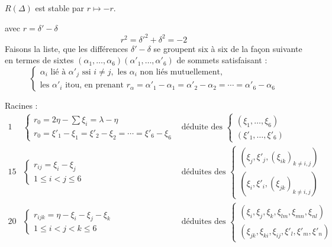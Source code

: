 \documentclass[11pt,a4paper]{article}
\begin{document}
$R(\Delta)$ est stable par $r \mapsto -r$.


avec $r = \delta' - \delta$
\[
r^2 = \delta'^2 + \delta^2 = -2
\]
Faisons la liste, 
\ill{} \ill{} que les différences  $\delta' -
\delta$ se groupent six à six de la façon suivante en termes de sixtes
 $(\alpha_1, \dots, \alpha_6)(\alpha'_1, \dots,
\alpha'_6)$  de sommets
satisfaisant :
\[
\begin{cases}
\alpha_i \text{ lié à } \alpha'_j \text{ ssi } i \neq j, \text{ les } \alpha_i \text{ non liés mutuellement}, \\
\text{les } \alpha'_i \text{ itou, en prenant } r_\alpha = \alpha'_1 - \alpha_1 = \alpha'_2 - \alpha_2 = \cdots = \alpha'_6 - \alpha_6
\end{cases}
\]

Racines :
\[
\begin{array}{lll}
1 & \begin{cases} r_0 = 2\eta - \sum \xi_i = \lambda - \eta \\ r_0 = \xi'_1 - \xi_1 = \xi'_2 - \xi_2 = \cdots = \xi'_6 - \xi_6 \end{cases}
& \text{déduite des } \begin{cases} (\xi_1, \dots, \xi_6) \\ (\xi'_1, \dots, \xi'_6) \end{cases} \\[3ex]
15 & \begin{cases} r_{ij} = \xi_i - \xi_j \\ 1 \leq i < j \leq 6 \end{cases}
& \text{déduites des } \begin{cases} (\xi_j, \xi'_j, (\xi_{ik})_{k \neq i,j}) \\ (\xi_i, \xi'_i, (\xi_{jk})_{k \neq i,j}) \end{cases} \\[3ex]
20 & \begin{cases} r_{ijk} = \eta - \xi_i - \xi_j - \xi_k \\ 1 \leq i < j < k \leq 6 \end{cases}
& \text{déduites des } \begin{cases} (\xi_i, \xi_j, \xi_k, \xi_{lm}, \xi_{mn}, \xi_{nl}) \\ (\xi_{jk}, \xi_{ki}, \xi_{ij}, \xi'_l, \xi'_m, \xi'_n) \end{cases}
\end{array}
\]
\end{document}
